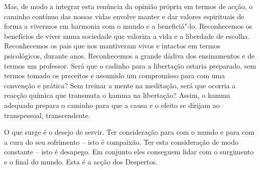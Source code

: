 Mas, de modo a integrar esta renúncia da opinião própria em termos de acção, o caminho contínuo das nossas vidas envolve manter e dar valores espirituais de forma a vivermos em harmonia com o mundo e a beneficiá"-lo. Reconhecemos os benefícios de viver numa sociedade que valoriza a vida e a liberdade de escolha. Reconhecemos os pais que nos mantiveram vivos e intactos em termos psicológicos, durante anos. Reconhecemos a grande dádiva dos ensinamentos e de termos um professor. Será que o cadinho para a libertação estaria preparado, sem termos tomado os preceitos e assumido um compromisso para com uma convenção e prática? Sem treinar a mente na meditação, será que ocorria a reacção química que transmuta o kamma na libertação? Assim, o kamma adequado prepara o caminho para que a causa e o efeito se dirijam ao transpessoal, transcendente.

O que surge é o desejo de servir. Ter consideração para com o mundo e para com a cura do seu sofrimento -- isto é compaixão. Ter esta consideração de modo constante -- isto é desapego. Em conjunto eles conseguem lidar com o surgimento e o final do mundo. Esta é a acção dos Despertos.
